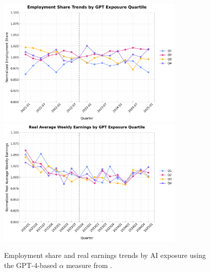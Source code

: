 \documentclass[12pt]{article}
\numberwithin{equation}{section}
\theoremstyle{theorem}\newcustomtheorem{theorem}{{\bf\sc Theorem}}
\theoremstyle{definition}\newcustomtheorem{assumption}{{\bf\sc Assumption}}
\theoremstyle{theorem} \newcustomtheorem{proposition}{{\bf\sc Proposition}}
\begin{document}
\appendix

\setcounter{figure}{0}
\renewcommand{\thefigure}{A\arabic{figure}}
\setcounter{table}{0}
\renewcommand{\thetable}{A\arabic{table}}

\section*{\\[0.6cm]
}

\begin{figure}[htbp]
	\centering
  \includegraphics[width=0.8\textwidth]{../figures/employment_share_by_gpt4_alpha_quartile_2021Q1.pdf}
  \includegraphics[width=0.8\textwidth]{../figures/real_earnings_by_gpt4_alpha_quartile_2021Q1.pdf}
	\caption{Employment share and real earnings trends by AI exposure using the GPT-4-based $\alpha$ measure from \citet{eloundou_gpts_2024}.}
	\label{fig:employment_trends_alpha}
\end{figure}
\end{document}
